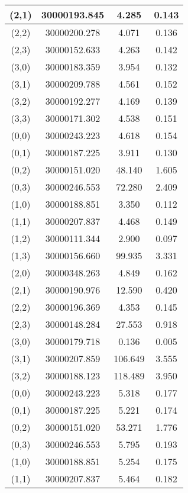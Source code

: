 \begin{table}
\begin{center}
\begin{tabular}{|c|c|c|c|}
			\hline
			(2,1) & 30000193.845 & 4.285 & 0.143 \\
			\hline
			(2,2) & 30000200.278 & 4.071 & 0.136 \\
			\hline
			(2,3) & 30000152.633 & 4.263 & 0.142 \\
			\hline
			(3,0) & 30000183.359 & 3.954 & 0.132 \\
			\hline
			(3,1) & 30000209.788 & 4.561 & 0.152 \\
			\hline
			(3,2) & 30000192.277 & 4.169 & 0.139 \\
			\hline
			(3,3) & 30000171.302 & 4.538 & 0.151 \\
			\hline
			(0,0) & 30000243.223 & 4.618 & 0.154 \\
			\hline
			(0,1) & 30000187.225 & 3.911 & 0.130 \\
			\hline
			(0,2) & 30000151.020 & 48.140 & 1.605 \\
			\hline
			(0,3) & 30000246.553 & 72.280 & 2.409 \\
			\hline
			(1,0) & 30000188.851 & 3.350 & 0.112 \\
			\hline
			(1,1) & 30000207.837 & 4.468 & 0.149 \\
			\hline
			(1,2) & 30000111.344 & 2.900 & 0.097 \\
			\hline
			(1,3) & 30000156.660 & 99.935 & 3.331 \\
			\hline
			(2,0) & 30000348.263 & 4.849 & 0.162 \\
			\hline
			(2,1) & 30000190.976 & 12.590 & 0.420 \\
			\hline
			(2,2) & 30000196.369 & 4.353 & 0.145 \\
			\hline
			(2,3) & 30000148.284 & 27.553 & 0.918 \\
			\hline
			(3,0) & 30000179.718 & 0.136 & 0.005 \\
			\hline
			(3,1) & 30000207.859 & 106.649 & 3.555 \\
			\hline
			(3,2) & 30000188.123 & 118.489 & 3.950 \\
			\hline
			(0,0) & 30000243.223 & 5.318 & 0.177 \\
			\hline
			(0,1) & 30000187.225 & 5.221 & 0.174 \\
			\hline
			(0,2) & 30000151.020 & 53.271 & 1.776 \\
			\hline
			(0,3) & 30000246.553 & 5.795 & 0.193 \\
			\hline
			(1,0) & 30000188.851 & 5.254 & 0.175 \\
			\hline
			(1,1) & 30000207.837 & 5.464 & 0.182 \\

\end{tabular}
\end{center}
\end{table}
